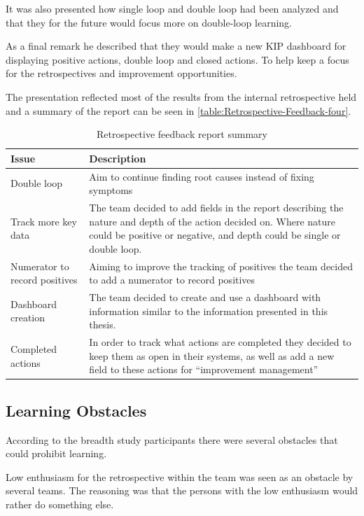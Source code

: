 It was also presented how single loop and double loop had been analyzed and that they for the future would focus more on double-loop learning. 

As a final remark he described that they would make a new KIP dashboard for displaying positive actions, double loop and closed actions. To help keep a focus for the retrospectives and improvement opportunities.

The presentation reflected most of the results from the internal retrospective held and a summary of the report can be seen in \autoref{table:Retrospective-Feedback-four}. 

\begin{table}[!h]
	\begin{center}
	\caption{Retrospective feedback report summary}
	\label{table:Retrospective-Feedback-four}
	\begin{tabular}{ l  p{} }
	\hline
	Issue & Description \\
	\hline
	Double loop & Aim to continue finding root causes instead of fixing symptoms \\
	Track more key data & The team decided to add fields in the report describing the nature and depth of the action decided on. Where nature could be positive or negative, and depth could be single or double loop.\\
	Numerator to record positives & Aiming to improve the tracking of positives the team decided to add a numerator to record positives \\
	Dashboard creation & The team decided to create and use a dashboard with information similar to the information presented in this thesis.  \\
	Completed actions & In order to track what actions are completed they decided to keep them as open in their systems, as well as add a new field to these actions for ``improvement management'' \\
	\hline
	\end{tabular}
	\end{center}
\end{table}

\subsection{Learning Obstacles}
\label{question-14}
According to the breadth study participants there were several obstacles that could prohibit learning. 

Low enthusiasm for the retrospective within the team was seen as an obstacle by several teams. The reasoning was that the persons with the low enthusiasm would rather do something else. 

